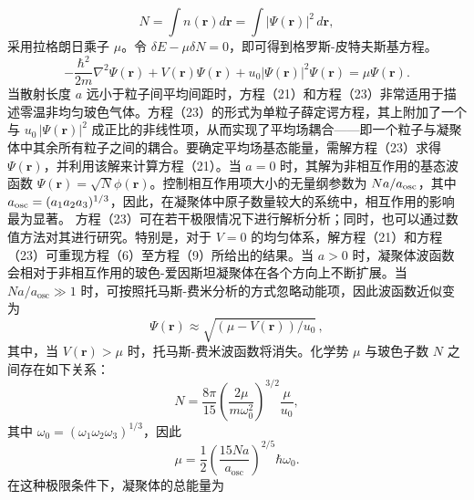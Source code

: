 \begin{equation}\tag{11.2.22}\label{eq:11.2.22}
N = \int n ( \mathbf { r } ) d \mathbf { r } = \int | \Psi ( \mathbf { r } ) | ^{2} \, d \mathbf { r } ,
\end{equation}
采用拉格朗日乘子 \(\mu\)。令 \(\delta E - \mu \delta N = 0\)，即可得到格罗斯-皮特夫斯基方程。
\begin{equation}\tag{11.2.23}\label{eq:11.2.23}
- \frac { \hbar ^{2} } { 2 m } \nabla ^{2} \Psi ( \pmb { r } ) + V ( \pmb { r } ) \Psi ( \pmb { r } ) + u _ { 0 } \left| \Psi ( \pmb { r } ) \right| ^{2} \Psi ( \pmb { r } ) = \mu \Psi ( \pmb { r } ) .
\end{equation}
当散射长度 \(a\) 远小于粒子间平均间距时，方程（21）和方程（23）非常适用于描述零温非均匀玻色气体。方程（23）的形式为单粒子薛定谔方程，其上附加了一个与 \(u_0 \, |\Psi(\boldsymbol{r})|^2\) 成正比的非线性项，从而实现了平均场耦合——即一个粒子与凝聚体中其余所有粒子之间的耦合。要确定平均场基态能量，需解方程（23）求得 \(\Psi(\boldsymbol{r})\)，并利用该解来计算方程（21）。当 \(a=0\) 时，其解为非相互作用的基态波函数 \(\Psi(\boldsymbol{r})=\sqrt{N}\phi(\boldsymbol{r})\)。控制相互作用项大小的无量纲参数为 \(Na/a_{\rm osc}\)，其中 \(a_{\rm osc}=(a_1a_2a_3)^{1/3}\)，因此，在凝聚体中原子数量较大的系统中，相互作用的影响最为显著。
方程（23）可在若干极限情况下进行解析分析；同时，也可以通过数值方法对其进行研究。特别是，对于 \(V=0\) 的均匀体系，解方程（21）和方程（23）可重现方程（6）至方程（9）所给出的结果。当 \(a>0\) 时，凝聚体波函数会相对于非相互作用的玻色-爱因斯坦凝聚体在各个方向上不断扩展。当 \(Na/a_{\mathrm{osc}}\gg1\) 时，可按照托马斯-费米分析的方式忽略动能项，因此波函数近似变为
\begin{equation}\tag{11.2.24}\label{eq:11.2.24}
\Psi ( \pmb { r } ) \approx \sqrt { ( \mu - V ( \pmb { r } ) ) / u _ { 0 } } \, ,
\end{equation}
其中，当 \(V(\boldsymbol{r}) > \mu\) 时，托马斯-费米波函数将消失。化学势 \(\mu\) 与玻色子数 \(N\) 之间存在如下关系：
\begin{equation}\tag{11.2.25}\label{eq:11.2.25}
N = \frac { 8 \pi } { 15 } \left( \frac { 2 \mu } { m \omega _ { 0 } ^{2} } \right) ^{3 / 2} \frac { \mu } { u _ { 0 } } ,
\end{equation}
其中 \(\omega_{0}=(\omega_{1}\omega_{2}\omega_{3})^{1/3}\)，因此
\begin{equation}\tag{11.2.26}\label{eq:11.2.26}
\mu = \frac { 1 } { 2 } \left( \frac { 15 N a } { a _ { \mathrm { o s c } } } \right) ^{2 / 5} \hbar \omega _ { 0 } .
\end{equation}
在这种极限条件下，凝聚体的总能量为
